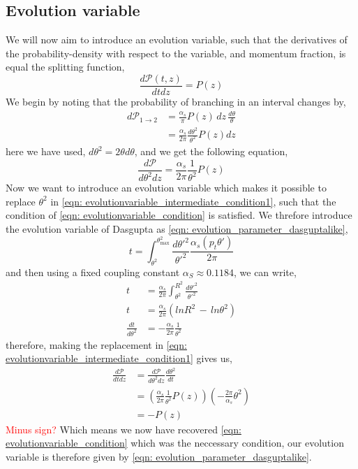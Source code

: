 \documentclass[main.tex]{subfiles}
\begin{document}
\subsection{Evolution variable}
We will now aim to introduce an evolution variable, such that the derivatives of the probability-density with respect to the variable, and momentum fraction, is equal the splitting function, 
\begin{equation}\label{eqn: evolutionvariable_condition}
    \frac{d \mathcal{P}(t,z)}{dt dz} = P(z)
\end{equation}
We begin by noting that the probability of branching in an interval changes by, 
\begin{align}
    d\mathcal{P}_{1\rightarrow 2} &= \frac{\alpha_s}{\pi} P(z) \, dz \, \frac{d\theta}{\theta} \nonumber \\
    &= \frac{\alpha_s}{2\pi} \frac{d\theta^2}{\theta^2} P(z) dz
\end{align}
here we have used, \(d\theta^2 =2\theta d\theta\), and we get the following equation,
\begin{equation}\label{eqn: evolutionvariable_intermediate_condition1}
    \frac{d\mathcal{P}}{d\theta^2 dz} = \frac{\alpha_s}{2\pi} \frac{1}{\theta^2} P(z)
\end{equation}
Now we want to introduce an evolution variable which makes it possible to replace \(\theta^2\) in \autoref{eqn: evolutionvariable_intermediate_condition1}, such that the condition of \autoref{eqn: evolutionvariable_condition} is satisfied.
We threfore introduce the evolution variable of Dasgupta \cite{Dasgupta_2015} as \autoref{eqn: evolution_parameter_dasguptalike},
\begin{equation}\label{eqn: evolution_parameter_dasguptalike}
    t = \int _{\theta^2}^{\theta_\text{max}^2} \frac{d\theta'^2}{\theta'^2} \frac{\alpha_s(p_t \theta')}{2\pi} 
\end{equation}
and then using a fixed coupling constant \(\alpha_S \approx 0.1184\), we can write,
\begin{align} 
    t &= \frac{\alpha_s}{2\pi} \int_{\theta^2}^{R^2} \frac{d\theta'^2}{\theta'^2} \nonumber \\
    t&= \frac{\alpha_s}{2\pi} \left( ln R^2 \, - \, ln \theta^2\right) \nonumber \\
    \frac{dt}{d\theta^2} &= - \frac{\alpha_s}{2\pi} \frac{1}{\theta^2}
\end{align}
therefore, making the replacement in \autoref{eqn: evolutionvariable_intermediate_condition1} gives us,
\begin{align}
     \frac{d\mathcal{P}}{dt dz} &= \frac{d\mathcal{P}}{d\theta^2 dz} \frac{d\theta^2}{dt} \nonumber\\
    &= \left( \frac{\alpha_s}{2\pi} \frac{1}{\theta^2} P(z) \right) \left( -\frac{2\pi}{\alpha_s} \theta^2 \right) \nonumber \\
    &= -P(z)
\end{align}
\textcolor{red}{Minus sign?}
Which means we now have recovered \autoref{eqn: evolutionvariable_condition} which was the neccessary condition, our evolution variable is therefore given by \autoref{eqn: evolution_parameter_dasguptalike}. 
\end{document}
